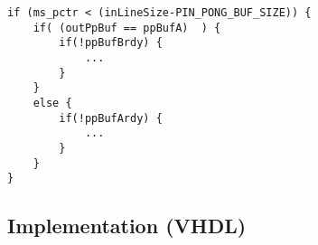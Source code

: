 \begin{minipage}{\textwidth}
\begin{lstlisting}[style=CStyle, caption=Buffer switching reloading with else statement, label=lst:buf_right]
if (ms_pctr < (inLineSize-PIN_PONG_BUF_SIZE)) {
	if( (outPpBuf == ppBufA)  ) {
		if(!ppBufBrdy) {
			...
		}
	}
	else {
		if(!ppBufArdy) {
			...
		}
	}
}
\end{lstlisting}
\end{minipage}

\subsection{Implementation (VHDL)}


